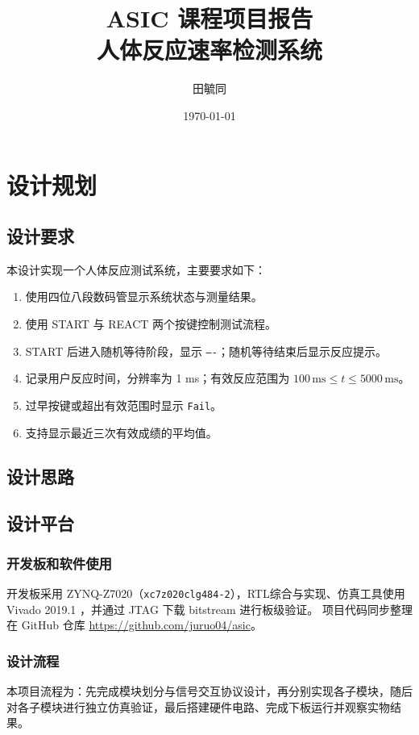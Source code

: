 \documentclass[UTF8]{ctexart}
\title{ASIC 课程项目报告\\人体反应速率检测系统}
\author{田毓同\quad 23307110048}
\date{\today}
\begin{document}
\maketitle
\tableofcontents
\clearpage

\section{设计规划}

\subsection{设计要求}
本设计实现一个人体反应测试系统，主要要求如下：
\begin{enumerate}
  \item 使用四位八段数码管显示系统状态与测量结果。
  \item 使用 START 与 REACT 两个按键控制测试流程。
  \item START 后进入随机等待阶段，显示 \texttt{----}；随机等待结束后显示反应提示。
  \item 记录用户反应时间，分辨率为 1 ms；有效反应范围为 $100\,\mathrm{ms}\le t\le 5000\,\mathrm{ms}$。
  \item 过早按键或超出有效范围时显示 \texttt{Fail}。
  \item 支持显示最近三次有效成绩的平均值。
\end{enumerate}

\subsection{设计思路}


\subsection{设计平台}

\subsubsection{开发板和软件使用}
开发板采用 ZYNQ-Z7020（\texttt{xc7z020clg484-2}），RTL综合与实现、仿真工具使用 Vivado 2019.1
，并通过 JTAG 下载 bitstream 进行板级验证。
项目代码同步整理在 GitHub 仓库 \url{https://github.com/juruo04/asic}。

\subsubsection{设计流程}
本项目流程为：先完成模块划分与信号交互协议设计，再分别实现各子模块，随后对各子模块进行独立仿真验证，最后搭建硬件电路、完成下板运行并观察实物结果。
\end{document}
